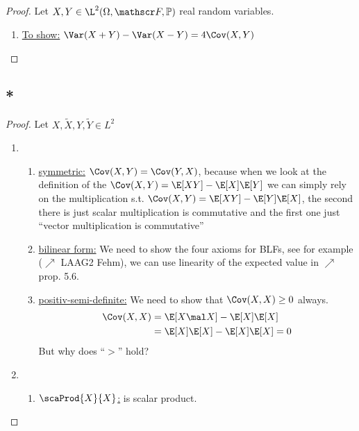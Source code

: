 \subsection{}
\begin{proof}
	Let $X,Y \in \L^2(\O, \F, \meas)$ real random variables.
	\begin{enumerate}
		\item \ul{To show:} $\Var(X+Y) - \Var(X-Y) = 4\Cov(X,Y)$
		
	\end{enumerate}
\end{proof}

\subsection{*}
\begin{proof} Let $X,\tilde{X}, Y, \tilde{Y} \in L^2$
	\begin{enumerate}
		\item 
		\begin{enumerate}
			\item \ul{symmetric:} $\Cov(X,Y) = \Cov(Y,X)$, because when we look at the definition of the $\Cov(X,Y) = \E[XY] - \E[X]\E[Y]$ we can simply rely on the multiplication s.t.
			$\Cov(X,Y) = \E[XY] - \E[Y]\E[X]$, the second there is just scalar multiplication is commutative and the first one just ``vector multiplication is commutative'' %
			\item \ul{bilinear form:} We need to show the four axioms for BLFs, see for example ($\nearrow$ LAAG2 Fehm), we can use linearity of the expected value in $\nearrow$ prop. 5.6.
			\item \ul{positiv-semi-definite:} We need to show that $\Cov(X,X) \ge 0$ always.
			\begin{align*}
				\Cov(X,X) &= \E[X\mal X] - \E[X]\E[X]\\
				&= \E[X]\E[X] - \E[X]\E[X] = 0
			\end{align*}
			But why does ``$>$'' hold? \label{6:6_a}
		\end{enumerate}
	\item 
		\begin{enumerate}
			\item \ul{$\scaProd{X}{X}$:} is scalar product.
			
		\end{enumerate}
	\end{enumerate}
\end{proof}